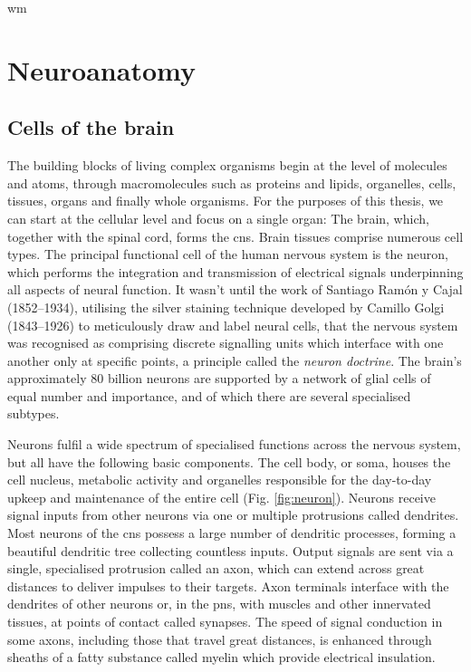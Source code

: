 \gls{wm}\chapter{Neuroanatomy}
\label{chap:neuroanatomy}

\section{Cells of the brain}

The building blocks of living complex organisms begin at the level of molecules and atoms, through macromolecules such as proteins and lipids, organelles, cells, tissues, organs and finally whole organisms.
For the purposes of this thesis, we can start at the cellular level and focus on a single organ:
The brain, which, together with the spinal cord, forms the \gls{cns}.
Brain tissues comprise numerous cell types.
The principal functional cell of the human nervous system is the neuron, which performs the integration and transmission of electrical signals underpinning all aspects of neural function.
It wasn't until the work of Santiago Ramón y Cajal (1852--1934), utilising the silver staining technique developed by Camillo Golgi (1843--1926) to meticulously draw and label neural cells, that the nervous system was recognised as comprising discrete signalling units which interface with one another only at specific points, a principle called the \textit{neuron doctrine}\autocite{Kandel2021a}.
The brain's approximately 80 billion neurons are supported by a network of glial cells of equal number and importance\autocite{Herculano-Houzel2014,vonBartheld2016}, and of which there are several specialised subtypes.

Neurons fulfil a wide spectrum of specialised functions across the nervous system, but all have the following basic components.
The cell body, or soma, houses the cell nucleus, metabolic activity and organelles responsible for the day-to-day upkeep and maintenance of the entire cell (Fig. \ref{fig:neuron}).
Neurons receive signal inputs from other neurons via one or multiple protrusions called dendrites.
Most neurons of the \gls{cns} possess a large number of dendritic processes, forming a beautiful dendritic tree collecting countless inputs.
Output signals are sent via a single, specialised protrusion called an axon, which can extend across great distances to deliver impulses to their targets.
Axon terminals interface with the dendrites of other neurons or, in the \gls{pns}, with muscles and other innervated tissues, at points of contact called synapses.
The speed of signal conduction in some axons, including those that travel great distances, is enhanced through sheaths of a fatty substance called myelin which provide electrical insulation.

